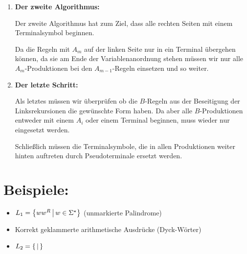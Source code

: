 \begin{enumerate}
	\item \textbf{Der zweite Algorithmus:}

	Der zweite Algorithmus hat zum Ziel, dass alle rechten Seiten mit einem Terminalsymbol beginnen.

	Da die Regeln mit $A_m$ auf der linken Seite nur in ein Terminal übergehen können, da sie am Ende der Variablenanordnung stehen müssen wir nur alle $A_m$-Produktionen bei den $A_{m-1}$-Regeln einsetzen und so weiter.

	\item \textbf{Der letzte Schritt:}

	Als letztes müssen wir überprüfen ob die $B$-Regeln aus der Beseitigung der Linksrekursionen die gewünschte Form haben.
	Da aber alle $B$-Produktionen entweder mit einem $A_i$ oder einem Terminal beginnen, muss wieder nur eingesetzt werden.

	Schließlich müssen die Terminalsymbole, die in allen Produktionen weiter hinten auftreten durch Pseudoterminale ersetzt werden.
\end{enumerate}

\section{Beispiele: }
\begin{itemize}
	\item $L_1=\left\{ ww^R \,\middle|\, w\in\Sigma^\star \right\}$ (unmarkierte Palindrome)
	\item Korrekt geklammerte arithmetische Ausdrücke (Dyck-Wörter)
	\item $L_2=\left\{  \,\middle|\,  \right\}$
\end{itemize}
